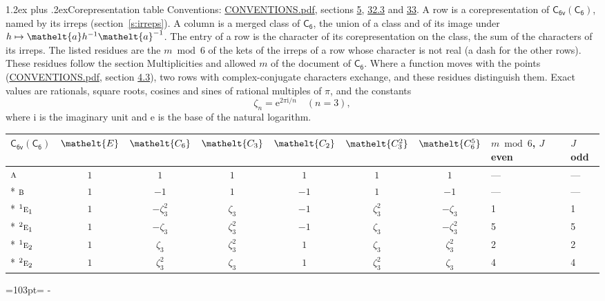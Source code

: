 \documentclass[10pt,a4paper]{article}
\makeatletter
\renewcommand\section{\@startsection{section}{1}{\z@}{-3ex plus -1ex minus -.2ex}%
  {1.2ex plus .2ex}{\normalfont\large\sffamily\bfseries\color{parttitle}}}
\newcommand{\needspace}[1]{\par\penalty-100\begingroup\dimen0=#1\relax\dimen2=\pagegoal
  \advance\dimen2-\pagetotal\ifdim\dimen0>\dimen2\relax\ifdim\dimen2>0pt\vfil\break\fi\fi
  \endgroup}
\numberwithin{equation}{section}
\newcommand{\eltfont}[1]{{\let\sigma\eltsigma\mathelt{#1}}}
\newcommand{\grp}[1]{\mathsf{#1}}
\newcommand{\irr}[1]{\text{\normalfont\scshape #1}}
\newcommand{\conjpair}[1]{{}^{#1}}
\newcommand{\cls}[1]{\eltfont{#1}}
\newcommand{\elt}[1]{\eltfont{#1}}
\newcommand{\iunit}{\mathrm{i}}
\newcommand{\expe}{\mathrm{e}}
\newcommand{\rootunity}[1]{\zeta_{#1}}
\makeatother
\begin{document}
\section{Corepresentation table}\label{s:character_table}
Conventions: \href{../../CONVENTIONS.pdf}{CONVENTIONS.pdf}, sections \href{../../../rotation/CONVENTIONS.pdf\#conv.5}{5}, \href{../../CONVENTIONS.pdf\#conv.32.3}{32.3} and \href{../../CONVENTIONS.pdf\#conv.33}{33}.
A row is a corepresentation of $\grp{C_{6v}}(\grp{C_{6}})$, named by its irreps (section~\ref{s:irreps}). A column is a merged class of $\grp{C_{6}}$, the union of a class and of its image under $h \mapsto \elt{a} h^{-1} \elt{a}^{-1}$. The entry of a row is the character of its corepresentation on the class, the sum of the characters of its irreps.
\leavevmode\label{n:head.parity}The listed residues are the $m \bmod 6$ of the kets of the irreps of a row whose character is not real (a dash for the other rows). These residues follow the section Multiplicities and allowed $m$ of the document of \href{../../../rotation/data/pdf/C6.pdf}{$\grp{C_{6}}$}. Where a function moves with the points (\href{../../CONVENTIONS.pdf}{CONVENTIONS.pdf}, section \href{../../../rotation/CONVENTIONS.pdf\#conv.4.3}{4.3}), two rows with complex-conjugate characters exchange, and these residues distinguish them.
\leavevmode\label{n:constant.root}\label{n:index.root.order}Exact values are rationals, square roots, cosines and sines of rational multiples of $\pi$, and the constants
\begin{equation}\label{e:constants}\rootunity{n} = \expe^{2\pi\iunit/n}\quad(n = 3),\end{equation}
where $\iunit$ is the imaginary unit and $\expe$ is the base of the natural logarithm.
{\small\setlength{\tabcolsep}{4pt}\begin{longtable}{@{}lccccccll@{}}\toprule
$\grp{C_{6v}}(\grp{C_{6}})$ & $\cls{E}$ & $\cls{C_{6}}$ & $\cls{C_{3}}$ & $\cls{C_{2}}$ & $\cls{C_{3}^{2}}$ & $\cls{C_{6}^{5}}$ & $m \bmod 6$, $J$ even & $J$ odd\\\midrule\endhead
\bottomrule\endfoot\endlastfoot
$\irr{a}$ & $1$ & $1$ & $1$ & $1$ & $1$ & $1$ & --- & ---\\*
$\irr{b}$ & $1$ & $-1$ & $1$ & $-1$ & $1$ & $-1$ & --- & ---\\*
$\conjpair{1}\irr{e}_{1}$ & $1$ & $-\rootunity{3}^{2}$ & $\rootunity{3}$ & $-1$ & $\rootunity{3}^{2}$ & $-\rootunity{3}$ & 1 & 1\\*
$\conjpair{2}\irr{e}_{1}$ & $1$ & $-\rootunity{3}$ & $\rootunity{3}^{2}$ & $-1$ & $\rootunity{3}$ & $-\rootunity{3}^{2}$ & 5 & 5\\*
$\conjpair{1}\irr{e}_{2}$ & $1$ & $\rootunity{3}$ & $\rootunity{3}^{2}$ & $1$ & $\rootunity{3}$ & $\rootunity{3}^{2}$ & 2 & 2\\*
$\conjpair{2}\irr{e}_{2}$ & $1$ & $\rootunity{3}^{2}$ & $\rootunity{3}$ & $1$ & $\rootunity{3}^{2}$ & $\rootunity{3}$ & 4 & 4\\
\bottomrule\end{longtable}}
\needspace{103pt}
\end{document}

